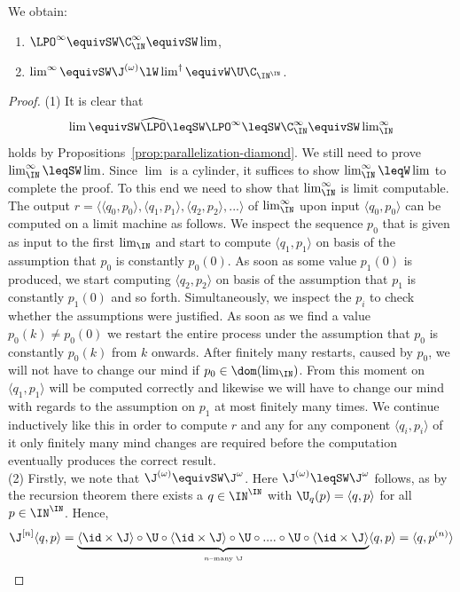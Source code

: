 \documentclass{lmcs}
\begin{document}
\begin{prop}
\label{prop:LPO-lim}
We obtain:
\begin{enumerate}
\item $\LPO^\infty\equivSW\C_\IN^\infty\equivSW\lim$,
\item $\lim^\infty\equivSW\J^{(\omega)}\lW\lim^\dagger\equivW\U\C_{\IN^\IN}$.
\end{enumerate}
\end{prop}
\begin{proof}
(1) It is clear that 
\[\lim\equivSW\widehat{\LPO}\leqSW\LPO^\infty\leqSW\C_\IN^\infty\equivSW\lim\nolimits_\IN^\infty\]
holds by
Propositions~\ref{prop:parallelization-diamond}. We still need to prove $\lim_\IN^\infty\leqSW\lim$.
Since $\lim$ is a cylinder, it suffices to show $\lim_\IN^\infty\leqW\lim$ to complete the proof.
To this end we need to show that $\lim_\IN^\infty$ is limit computable.
The output $r=\langle \langle q_0,p_0\rangle,\langle q_1, p_1\rangle,\langle q_2, p_2\rangle,...\rangle$ of 
$\lim_\IN^\infty$ upon input $\langle q_0,p_0\rangle$ can be
computed on a limit machine as follows. We inspect the sequence $p_0$  
that is given as input to the first $\lim_\IN$
and start to compute $\langle q_1,p_1\rangle$ on basis of the assumption that $p_0$ is constantly $p_0(0)$.
As soon as some value $p_1(0)$ is produced, we start computing $\langle q_2,p_2\rangle$ on basis of
the assumption that $p_1$ is constantly $p_1(0)$ and so forth. Simultaneously, we inspect the $p_i$
to check whether the assumptions were justified. As soon as we find a value $p_0(k)\not=p_0(0)$
we restart the entire process under the assumption that $p_0$ is constantly $p_0(k)$ from $k$ onwards.
After finitely many restarts, caused by $p_0$, we will not have to change our mind if $p_0\in\dom(\lim_\IN)$.
From this moment on $\langle q_1,p_1\rangle$ will be computed correctly and likewise we will have
to change our mind with regards to the assumption on $p_1$ at most finitely many times. 
We continue inductively like this in order to compute $r$ and any for any component $\langle q_i,p_i\rangle$
of it only finitely many mind changes are required before the computation eventually produces the correct result.\\
(2) Firstly, we note that $\J^{(\omega)}\equivSW\J^\omega$. Here $\J^{(\omega)}\leqSW\J^\omega$ follows,
as by the recursion theorem there exists a $q\in\IN^\IN$ with $\U_q(p)=\langle q,p\rangle$ for all $p\in\IN^\IN$.
Hence,
\[\J^{[n]}\langle q,p\rangle=\underbrace{\langle\id\times \J\rangle\circ\U\circ\langle \id\times \J\rangle\circ \U\circ....\circ\U\circ\langle\id\times\J\rangle}_{\mbox{\tiny $n$--many $\J$}}\langle q,p\rangle=\langle q,p^{(n)}\rangle\]

\end{proof}
\end{document}
